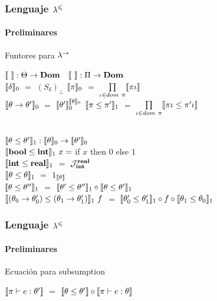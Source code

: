 \documentclass{beamer}
\begin{document}
\begin{frame}
\frametitle{Lenguaje $\lambda^{\leqslant}$}
\framesubtitle{Preliminares}

\begin{block}{Funtores para $\lambda^{\rightarrow}$}

$\llbracket  \  \rrbracket : \Theta \rightarrow \textbf{Dom}$ 
\quad \quad \quad \quad \quad \quad \quad \quad \
$\llbracket  \  \rrbracket : \Pi \rightarrow \textbf{Dom}$ \\

$\llbracket \delta \rrbracket_0$ $=$ $(S_\delta)_\bot$
\quad \quad \quad \quad \quad \quad \quad \quad \quad
$\llbracket \pi \rrbracket_0$ $=$ $\prod\limits_{\iota \in dom \ \pi} \llbracket \pi\iota \rrbracket$\\
$\llbracket \theta \rightarrow \theta' \rrbracket_0$ $=$ $\llbracket \theta' \rrbracket_0^{\llbracket \theta \rrbracket_0}$
\quad \quad \quad \quad \quad \quad \pause
$\llbracket \pi \leq \pi' \rrbracket_1$ $=$ $\prod\limits_{\iota \in dom \ \pi} \llbracket \pi\iota \leq \pi'\iota \rrbracket$\\

\

$\llbracket \theta \leq \theta' \rrbracket_{1} :
\llbracket \theta \rrbracket_{0} \rightarrow \llbracket \theta' \rrbracket_{0}$\\
$\llbracket \textbf{bool} \leq \textbf{int} \rrbracket_1 \ x =$ if $x$ then $0$ else $1$\\
$\llbracket \textbf{int} \leq \textbf{real} \rrbracket_1$ $=$ $\mathcal{J}_{\textbf{int}}^{\textbf{real}}$ \\
$\llbracket \theta \leq \theta \rrbracket_1$ $=$ $1_{\llbracket \theta \rrbracket}$\\
$\llbracket \theta \leq \theta'' \rrbracket_1$ $=$ $\llbracket \theta' \leq \theta'' \rrbracket_1 \circ \llbracket \theta \leq \theta' \rrbracket_1$\\
$\llbracket (\theta_0 \rightarrow \theta'_0) \leq (\theta_1 \rightarrow \theta'_1) \rrbracket_1 \ f$ 
$=$ $\llbracket \theta'_0 \leq \theta'_1 \rrbracket_1 \circ f \circ \llbracket \theta_1 \leq \theta_0 \rrbracket_1$

\end{block}

\end{frame}

\begin{frame}
\frametitle{Lenguaje $\lambda^{\leqslant}$}
\framesubtitle{Preliminares}

\begin{block}{Ecuación para subsumption}
\begin{center}
$\llbracket \pi \vdash e : \theta' \rrbracket$ $=$ $\llbracket \theta \leq \theta' \rrbracket \circ \llbracket \pi \vdash e : \theta \rrbracket$
\end{center}
\end{block}

\end{frame}
\end{document}
